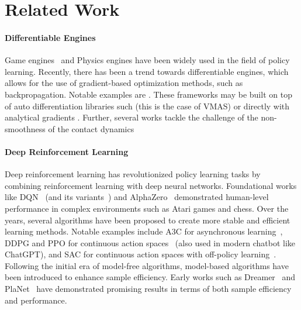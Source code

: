 \section{Related Work}

\paragraph{Differentiable Engines}
Game engines~\cite{Bellemare13,Balla23} and Physics engines \cite{Todorov12,Coumans16} have been widely used in the field of policy learning. Recently, there has been a trend towards differentiable engines, which allows for the use of gradient-based optimization methods, such as backpropagation. Notable examples are \cite{Freeman21,Howell22,Genesis24}. These frameworks may be built on top of auto differentiation libraries such \cite{Bradbury18,Ansel24} (this is the case of VMAS) or directly with analytical gradients \cite{Carpentier18,Werling21}. Further, several works tackle the challenge of the non-smoothness of the contact dynamics \cite{Degrave19,Moritz20}

\paragraph{Deep Reinforcement Learning}
Deep reinforcement learning has revolutionized policy learning tasks by combining reinforcement learning with deep neural networks. 
Foundational works like DQN~\cite{Mnih13} (and its variants~\cite{DBLP:conf/aaai/HesselMHSODHPAS18})
and AlphaZero~\cite{Silver17} demonstrated human-level performance in complex environments such as Atari games and chess. 
Over the years, several algorithms have been proposed to create more stable and efficient learning methods. 
Notable examples include A3C for asynchronous learning~\cite{DBLP:conf/icml/MnihBMGLHSK16}, 
DDPG and PPO for continuous action spaces~\cite{DBLP:journals/corr/LillicrapHPHETS15,Schulman17} (also used in modern chatbot like ChatGPT), 
and SAC for continuous action spaces with off-policy learning~\cite{DBLP:conf/icml/HaarnojaZAL18}. 
Following the initial era of model-free algorithms, 
model-based algorithms have been introduced to enhance sample efficiency. 
Early works such as Dreamer~\cite{DBLP:conf/iclr/HafnerLB020} and PlaNet~\cite{DBLP:conf/icml/HafnerLFVHLD19} have demonstrated promising results in terms of both sample efficiency and performance.

